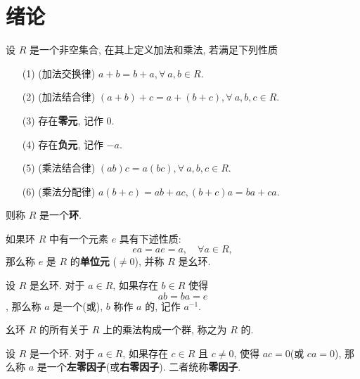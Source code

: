 \newpage

\chapter*{绪论}




\begin{definition}\label{环}
	设 $R$ 是一个非空集合, 在其上定义加法和乘法, 若满足下列性质
	\begin{itemize}[leftmargin=1.5cm]
		\item[(1)](加法交换律) $a+b=b+a,\forall\ a,b\in R$.
		\item[(2)](加法结合律) $(a+b)+c = a+(b+c),\forall\ a,b,c\in R$.
		\item[(3)] 存在\textbf{零元}, 记作 $0$.
		\item[(4)] 存在\textbf{负元}, 记作 $-a$.
		\item[(5)](乘法结合律) $(ab)c=a(bc),\forall\ a,b,c\in R$.
		\item[(6)](乘法分配律) $a(b+c)=ab+ac,(b+c)a=ba+ca$.
	\end{itemize}
	则称 $R$ 是一个\textbf{环}.
\end{definition}

\begin{definition}\label{环的单位元}
	如果环 $R$ 中有一个元素 $e$ 具有下述性质: $$ea=ae=a,\quad\forall a\in R,$$ 那么称 $e$ 是 $R$ 的\textbf{单位元} ($\neq 0$), 并称 $R$ 是幺环.
\end{definition}

\begin{definition}
	设 $R$ 是幺环. 对于 $a\in R$,  如果存在 $b\in R$ 使得 $$ab=ba=e$$, 那么称 $a$ 是一个(或), $b$ 称作 $a$ 的, 记作 $a^{-1}$.
\end{definition}

\begin{definition}
	幺环 $R$ 的所有关于 $R$ 上的乘法构成一个群, 称之为 $R$ 的.
\end{definition}

\begin{definition}\label{零因子}
	设 $R$ 是一个环. 对于 $a\in R$, 如果存在 $c\in R$ 且 $c\neq 0$, 使得 $ac=0$(或 $ca=0$), 那么称 $a$ 是一个\textbf{左零因子}(或\textbf{右零因子}). 二者统称\textbf{零因子}.
\end{definition}


